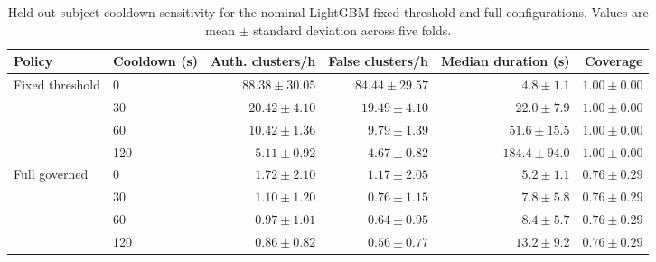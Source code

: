 \documentclass[11pt,a4paper]{article}
\begin{document}
\begin{table}[H]
\centering
\caption{Held-out-subject cooldown sensitivity for the nominal LightGBM fixed-threshold and full configurations. Values are mean $\pm$ standard deviation across five folds.}
\label{tab:cooldown}
\scriptsize
\setlength{\tabcolsep}{5pt}
\renewcommand{\arraystretch}{1.15}
\begin{tabular}{llrrrr}
\toprule
Policy & Cooldown (s) & Auth. clusters/h & False clusters/h & Median duration (s) & Coverage \\
\midrule
\multirow{4}{*}{Fixed threshold}
& 0   & $88.38\pm30.05$ & $84.44\pm29.57$ & $4.8\pm1.1$ & $1.00\pm0.00$ \\
& 30  & $20.42\pm4.10$ & $19.49\pm4.10$ & $22.0\pm7.9$ & $1.00\pm0.00$ \\
& 60  & $10.42\pm1.36$ & $9.79\pm1.39$ & $51.6\pm15.5$ & $1.00\pm0.00$ \\
& 120 & $5.11\pm0.92$ & $4.67\pm0.82$ & $184.4\pm94.0$ & $1.00\pm0.00$ \\
\midrule
\multirow{4}{*}{Full governed}
& 0   & $1.72\pm2.10$ & $1.17\pm2.05$ & $5.2\pm1.1$ & $0.76\pm0.29$ \\
& 30  & $1.10\pm1.20$ & $0.76\pm1.15$ & $7.8\pm5.8$ & $0.76\pm0.29$ \\
& 60  & $0.97\pm1.01$ & $0.64\pm0.95$ & $8.4\pm5.7$ & $0.76\pm0.29$ \\
& 120 & $0.86\pm0.82$ & $0.56\pm0.77$ & $13.2\pm9.2$ & $0.76\pm0.29$ \\
\bottomrule
\end{tabular}
\end{table}
\FloatBarrier
\end{document}
